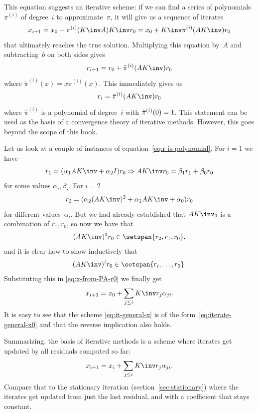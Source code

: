 This equation suggests an iterative scheme: if we can find a
series of polynomials~$\pi^{(i)}$ of degree~$i$
to approximate~$\pi$, it will give
us a sequence of iterates 
\begin{equation}
  x_{i+1} = x_0+\pi^{(i)}(K\inv A)K\inv r_0
  = x_0+K\inv \pi^{(i)}(AK\inv) r_0
  \label{eq:x-from-PA-r0}
\end{equation}
that ultimately reaches the true solution.
Multiplying this equation by~$A$ and subtracting~$b$ on both sides gives
\[ r_{i+1} = r_0+\tilde\pi^{(i)}(AK\inv)r_0 \]
where $\tilde\pi^{(i)}(x)=x\pi^{(i)}(x)$. This immediately gives us
\begin{equation}
  r_i = \hat\pi^{(i)}(AK\inv) r_0
  \label{eq:r-is-polynomial}
\end{equation}
where $\hat\pi^{(i)}$ is a polynomial of degree~$i$ with
$\hat\pi^{(i)}(0)=\nobreak1$. This statement can be used as the basis
of a convergence theory of iterative methods. However, this goes
beyond the scope of this book.

Let us look at a couple of instances of
equation~\eqref{eq:r-is-polynomial}. For $i=1$ we have
\[
  r_1 = (\alpha_1AK\inv+\alpha_2I)r_0 \Rightarrow 
  AK\inv r_0 = \beta_1r_1+\beta_0r_0
\]
for some values $\alpha_i,\beta_i$. For $i=2$
\[ r_2 = (\alpha_2(AK\inv )^2+\alpha_1AK\inv +\alpha_0)r_0 \]
for different values~$\alpha_i$. But we had already established that
$AK\inv_0$ is a combination of $r_1,r_0$, so now we have that 
\[ (AK\inv)^2r_0\in \setspan{r_2,r_1,r_0}, \]
and it is clear how to show inductively that 
\begin{equation}
  (AK\inv)^ir_0\in\setspan{r_i,\ldots,r_0}.
\end{equation}
Substituting this in \eqref{eq:x-from-PA-r0} we finally get
\begin{equation}
  x_{i+1} = x_0 +\sum_{j\leq i} K\inv r_j\alpha_{ji}.
  \label{eq:iterate-general-x0}
\end{equation}
It is easy to see that the scheme \eqref{eq:it-general-x} is of the
form~\eqref{eq:iterate-general-x0} and
that the reverse implication also holds.

Summarizing, the basis of iterative methods is a scheme where
iterates get updated by all residuals computed so far:
\begin{equation}
  x_{i+1} = x_i+\sum_{j\leq i}K\inv r_j\alpha_{ji}.
  \label{eq:preconditioned-iteration}
\end{equation}
Compare that to the stationary iteration
(section~\ref{sec:stationary}) where the iterates get updated from
just the last residual, and with a coefficient that stays constant.

